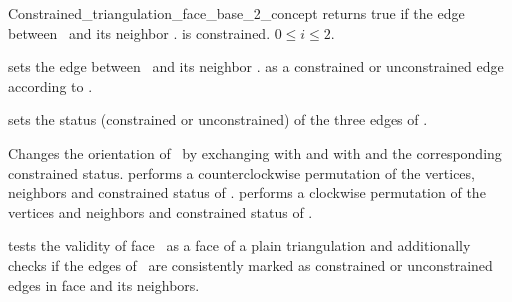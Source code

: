 \begin{ccRefConcept}{Constrained_triangulation_face_base_2_concept}
{returns true if the edge between \ccVar\ and its neighbor 
\ccVar . is constrained.
\ccPrecond $0\leq i \leq 2$.}

\begin{ccAdvanced}
\ccModifiers
{}
{sets the edge between \ccVar\ and its neighbor \ccVar .
 as a constrained or unconstrained edge according to .}

{sets the status (constrained or unconstrained) of the three
edges of \ccVar.}

{Changes the orientation of \ccVar\ by exchanging 
with  and  with 
and the corresponding constrained status.}
{performs a counterclockwise permutation of the
 vertices, neighbors and constrained status of  \ccVar.}
{performs a clockwise permutation of the
 vertices and neighbors and constrained status of \ccVar.}



{tests the validity of face  \ccVar\ 
as a face of a plain triangulation
and additionally checks
if the edges of \ccVar\ are consistently marked
as constrained or unconstrained edges
in face \ccVar and its neighbors.}
\end{ccAdvanced}



\ccHasModels



\ccSeeAlso
{} \\
 \\


\end{ccRefConcept}


